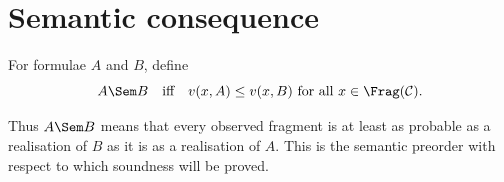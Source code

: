 \section{Semantic consequence}
\begin{definition}
For formulae $A$ and $B$, define
\[
A \Sem B
\quad\text{iff}\quad
v(x,A) \leq v(x,B) \text{ for all } x \in \Frag(\mathcal C).
\]
\end{definition}

Thus $A \Sem B$ means that every observed fragment is at least as probable as a realisation of
$B$ as it is as a realisation of $A$. This is the semantic preorder with respect to which soundness
will be proved.

